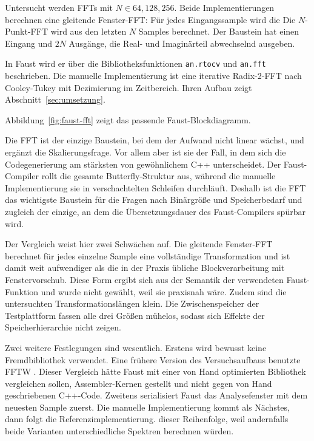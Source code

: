 Untersucht werden FFTs mit $N \in {64, 128, 256}$. Beide Implementierungen
berechnen eine gleitende Fenster-FFT: Für jedes Eingangssample wird die
Die $N$-Punkt-FFT wird aus den letzten $N$ Samples berechnet. Der Baustein hat
einen Eingang und $2N$ Ausgänge, die Real- und Imaginärteil abwechselnd
ausgeben.

In Faust wird er über die Bibliotheksfunktionen \texttt{an.rtocv} und \texttt{an.fft} beschrieben. Die manuelle Implementierung ist eine iterative Radix-2-FFT \parencite{lyons2004understanding} nach Cooley-Tukey \parencite{cooley1965algorithm} mit Dezimierung im Zeitbereich. Ihren Aufbau zeigt Abschnitt~\ref{sec:umsetzung}.

Abbildung~\ref{fig:faust-fft} zeigt das passende Faust-Blockdiagramm.


Die FFT ist der einzige Baustein, bei dem der Aufwand nicht linear wächst, und ergänzt die Skalierungsfrage. Vor allem aber ist sie der Fall, in dem sich die Codegenerierung am stärksten von gewöhnlichem C++ unterscheidet. Der Faust-Compiler rollt die gesamte Butterfly-Struktur \parencite{lyons2004understanding} aus, während die manuelle Implementierung sie in verschachtelten Schleifen durchläuft. Deshalb ist die FFT das wichtigste Baustein für die Fragen nach Binärgröße und Speicherbedarf und zugleich der einzige, an dem die Übersetzungsdauer des Faust-Compilers spürbar wird.

Der Vergleich weist hier zwei Schwächen auf. Die gleitende Fenster-FFT berechnet für
jedes einzelne Sample eine vollständige Transformation und ist damit weit
aufwendiger als die in der Praxis übliche Blockverarbeitung mit Fenstervorschub. Diese Form ergibt sich aus der Semantik der verwendeten Faust-Funktion und wurde nicht gewählt, weil sie praxisnah wäre. Zudem sind die untersuchten Transformationslängen klein. Die Zwischenspeicher der Testplattform fassen alle drei Größen mühelos, sodass sich Effekte der Speicherhierarchie nicht zeigen.

Zwei weitere Festlegungen sind wesentlich. Erstens wird bewusst keine Fremdbibliothek verwendet. Eine frühere Version des Versuchsaufbaus benutzte FFTW \parencite{lyons2004understanding}. Dieser Vergleich hätte Faust mit einer von Hand optimierten Bibliothek vergleichen sollen, Assembler-Kernen gestellt und nicht gegen von Hand geschriebenen C++-Code. Zweitens serialisiert Faust das Analysefenster mit dem neuesten Sample zuerst. Die manuelle Implementierung kommt als Nächstes, dann folgt die Referenzimplementierung. dieser Reihenfolge, weil andernfalls beide Varianten unterschiedliche Spektren berechnen würden.

